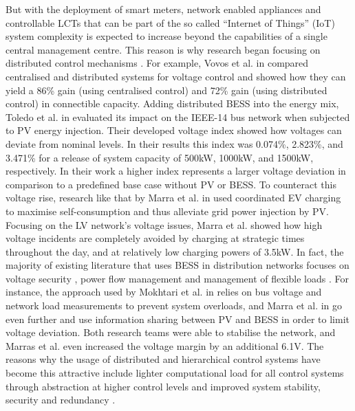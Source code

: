 But with the deployment of smart meters, network enabled appliances and controllable LCTs that can be part of the so called ``Internet of Things'' (IoT) system complexity is expected to increase beyond the capabilities of a single central management centre.
This reason is why research began focusing on distributed control mechanisms \cite{Vovos2007, Guerrero2008, Bidram2014, Toledo2013, Marra2013, Gill2014, Dolan2012, Atia2016, Bidram2012, Wang2016}.
For example, Vovos et al. in \cite{Vovos2007} compared centralised and distributed systems for voltage control and showed how they can yield a 86\% gain (using centralised control) and 72\% gain (using distributed control) in connectible capacity.
Adding distributed BESS into the energy mix, Toledo et al. in \cite{Toledo2013} evaluated its impact on the IEEE-14 bus network when subjected to PV energy injection.
Their developed voltage index showed how voltages can deviate from nominal levels.
In their results this index was 0.074\%, 2.823\%, and 3.471\% for a release of system capacity of 500kW, 1000kW, and 1500kW, respectively.
In their work a higher index represents a larger voltage deviation in comparison to a predefined base case without PV or BESS.
To counteract this voltage rise, research like that by Marra et al. in \cite{Marra2013} used coordinated EV charging to maximise self-consumption and thus alleviate grid power injection by PV.
Focusing on the LV network's voltage issues, Marra et al. showed how high voltage incidents are completely avoided by charging at strategic times throughout the day, and at relatively low charging powers of 3.5kW.
In fact, the majority of existing literature that uses BESS in distribution networks focuses on voltage security \cite{Sugihara2013, Toledo2013, Marra2013, Mokhtari2013, Atia2016}, power flow management \cite{Guerrero2008, Wang2016} and management of flexible loads \cite{Gill2014, Dolan2012}.
For instance, the approach used by Mokhtari et al. in \cite{Mokhtari2013} relies on bus voltage and network load measurements to prevent system overloads, and Marra et al. in \cite{Marra2013} go even further and use information sharing between PV and BESS in order to limit voltage deviation.
Both research teams were able to stabilise the network, and Marras et al. even increased the voltage margin by an additional 6.1V.
The reasons why the usage of distributed and hierarchical control systems have become this attractive include lighter computational load for all control systems through abstraction at higher control levels and improved system stability, security and redundancy \cite{Guerrero2013, Guerrero2013a}.


